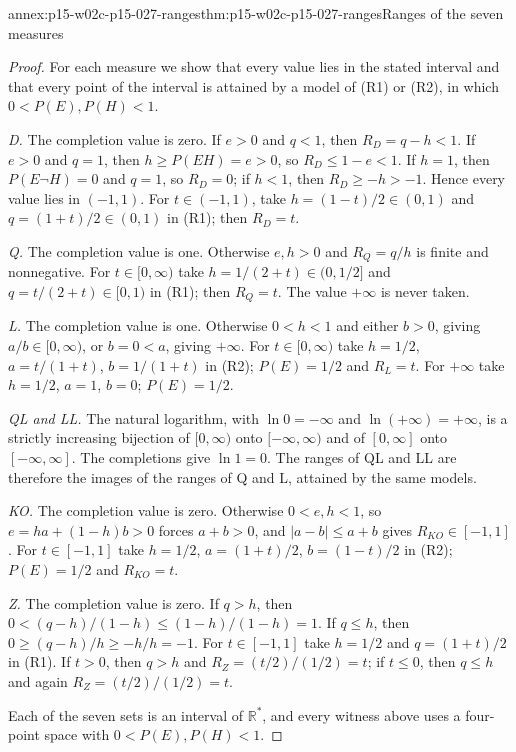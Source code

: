 \begin{annexitem}{annex:p15-w02c-p15-027-ranges}{thm:p15-w02c-p15-027-ranges}{Ranges of the seven measures}
\begin{proof}
For each measure we show that every value lies in the stated interval
and that every point of the interval is attained by a model of (R1) or
(R2), in which \(0<P(E),P(H)<1\).

\emph{D.} The completion value is zero. If \(e>0\) and \(q<1\), then
\(R_D=q-h<1\). If \(e>0\) and \(q=1\), then \(h\geq P(EH)=e>0\), so
\(R_D\leq1-e<1\). If \(h=1\), then \(P(E\neg H)=0\) and \(q=1\), so
\(R_D=0\); if \(h<1\), then \(R_D\geq-h>-1\). Hence every value lies in
\((-1,1)\). For \(t\in(-1,1)\), take \(h=(1-t)/2\in(0,1)\) and
\(q=(1+t)/2\in(0,1)\) in (R1); then \(R_D=t\).

\emph{Q.} The completion value is one. Otherwise \(e,h>0\) and
\(R_Q=q/h\) is finite and nonnegative. For \(t\in[0,\infty)\) take
\(h=1/(2+t)\in(0,1/2]\) and \(q=t/(2+t)\in[0,1)\) in (R1); then
\(R_Q=t\). The value \(+\infty\) is never taken.

\emph{L.} The completion value is one. Otherwise \(0<h<1\) and either
\(b>0\), giving \(a/b\in[0,\infty)\), or \(b=0<a\), giving \(+\infty\).
For \(t\in[0,\infty)\) take \(h=1/2\), \(a=t/(1+t)\), \(b=1/(1+t)\) in
(R2); \(P(E)=1/2\) and \(R_L=t\). For \(+\infty\) take \(h=1/2\),
\(a=1\), \(b=0\); \(P(E)=1/2\).

\emph{QL and LL.} The natural logarithm, with \(\ln0=-\infty\) and
\(\ln(+\infty)=+\infty\), is a strictly increasing bijection of
\([0,\infty)\) onto \([-\infty,\infty)\) and of \([0,\infty]\) onto
\([-\infty,\infty]\). The completions give \(\ln1=0\). The ranges of QL
and LL are therefore the images of the ranges of Q and L, attained by the
same models.

\emph{KO.} The completion value is zero. Otherwise \(0<e,h<1\), so
\(e=ha+(1-h)b>0\) forces \(a+b>0\), and \(|a-b|\leq a+b\) gives
\(R_{KO}\in[-1,1]\). For \(t\in[-1,1]\) take \(h=1/2\), \(a=(1+t)/2\),
\(b=(1-t)/2\) in (R2); \(P(E)=1/2\) and \(R_{KO}=t\).

\emph{Z.} The completion value is zero. If \(q>h\), then
\(0<(q-h)/(1-h)\leq(1-h)/(1-h)=1\). If \(q\leq h\), then
\(0\geq(q-h)/h\geq-h/h=-1\). For \(t\in[-1,1]\) take \(h=1/2\) and
\(q=(1+t)/2\) in (R1). If \(t>0\), then \(q>h\) and
\(R_Z=(t/2)/(1/2)=t\); if \(t\leq0\), then \(q\leq h\) and again
\(R_Z=(t/2)/(1/2)=t\).

Each of the seven sets is an interval of \(\mathbb R^*\), and every
witness above uses a four-point space with \(0<P(E),P(H)<1\).


\end{proof}
\end{annexitem}

